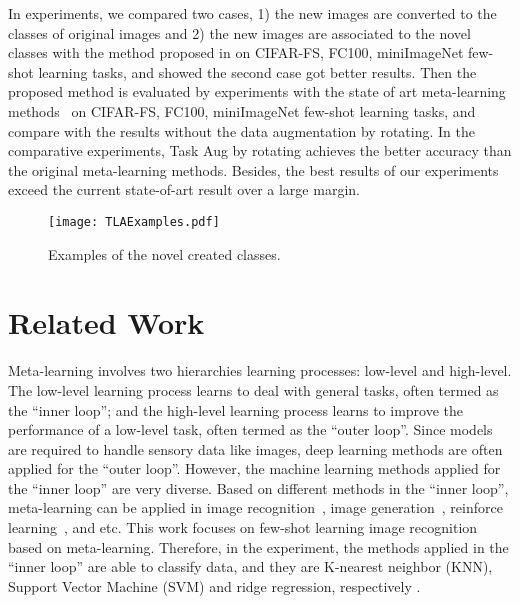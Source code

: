\documentclass[10pt,twocolumn,letterpaper]{article}
\begin{document}
In experiments, we compared two cases, 1) the new images are converted to the classes of original images and 2) the new images are associated to the novel classes with the method proposed in \cite{bertinetto2018meta} on CIFAR-FS, FC100, miniImageNet few-shot learning tasks, and showed the second case got better results. Then the proposed method is evaluated by experiments with the state of art meta-learning methods~\cite{snell2017prototypical,lee2019meta,bertinetto2018meta} on CIFAR-FS, FC100, miniImageNet few-shot learning tasks, and compare with the results without the data augmentation by rotating. In the comparative experiments, Task Aug by rotating achieves the better accuracy than the original meta-learning methods. Besides, the best results of our experiments exceed the current state-of-art result over a large margin.

\begin{figure*}[t]
\begin{center}
\texttt{[image: TLAExamples.pdf]}
\end{center}
\caption{Examples of the novel created classes.}
\label{TLAExamples}
\end{figure*}

\section{Related Work}\label{Related_Work}
Meta-learning involves two hierarchies learning processes: low-level and high-level. The low-level learning process learns to deal with general tasks, often termed as the ``inner loop''; and the high-level learning process learns to improve the performance of a low-level task, often termed as the ``outer loop''. Since models are required to handle sensory data like images, deep learning methods are often applied for the ``outer loop''. However, the machine learning methods applied for the ``inner loop'' are very diverse. Based on different methods in the ``inner loop'', meta-learning can be applied in image recognition~\cite{fei2006one,santoro2016meta,finn2017model,vinyals2016matching,ravi2017optimization}, image generation~\cite{antoniou2017data,zhang2018metagan,rezende2016one}, reinforce learning~\cite{finn2017model,al2017continuous}, and etc. This work focuses on few-shot learning image recognition based on meta-learning. Therefore, in the experiment, the methods applied in the ``inner loop'' are able to classify data, and they are K-nearest neighbor (KNN), Support Vector Machine (SVM) and ridge regression, respectively \cite{snell2017prototypical,lee2019meta,bertinetto2018meta}.
\end{document}
